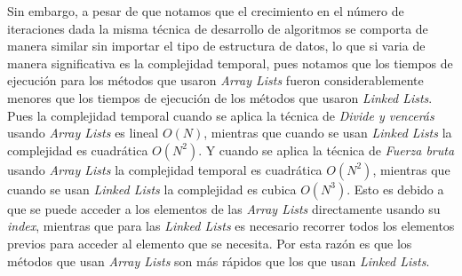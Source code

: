 Sin embargo, a pesar de que notamos que el crecimiento en el número de iteraciones dada la misma técnica de desarrollo de algoritmos se comporta de manera similar sin importar el tipo de estructura de datos, lo que si varia de manera significativa es la complejidad temporal, pues notamos que los tiempos de ejecución para los métodos que usaron \textit{Array Lists} fueron considerablemente menores que los tiempos de ejecución de los métodos que usaron \textit{Linked Lists}. Pues la complejidad temporal cuando se aplica la técnica de \textit{Divide y vencerás} usando \textit{Array Lists} es lineal $O(N)$, mientras que cuando se usan \textit{Linked Lists} la complejidad es cuadrática $O(N^2)$. Y cuando se aplica la técnica de \textit{Fuerza bruta} usando \textit{Array Lists} la complejidad temporal es cuadrática $O(N^2)$, mientras que cuando se usan \textit{Linked Lists} la complejidad es cubica $O(N^3)$. Esto es debido a que se puede acceder a los elementos de las \textit{Array Lists} directamente usando su \textit{index}, mientras que para las \textit{Linked Lists} es necesario recorrer todos los elementos previos para acceder al elemento que se necesita. Por esta razón es que los métodos que usan \textit{Array Lists} son más rápidos que los que usan \textit{Linked Lists}.
